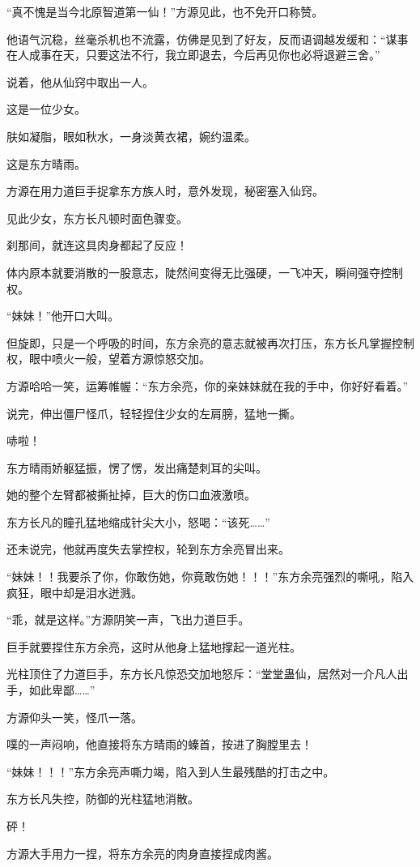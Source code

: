 \begin{this_body}
“真不愧是当今北原智道第一仙！”方源见此，也不免开口称赞。

他语气沉稳，丝毫杀机也不流露，仿佛是见到了好友，反而语调越发缓和：“谋事在人成事在天，只要这法不行，我立即退去，今后再见你也必将退避三舍。”

说着，他从仙窍中取出一人。

这是一位少女。

肤如凝脂，眼如秋水，一身淡黄衣裙，婉约温柔。

这是东方晴雨。

方源在用力道巨手捉拿东方族人时，意外发现，秘密塞入仙窍。

见此少女，东方长凡顿时面色骤变。

刹那间，就连这具肉身都起了反应！

体内原本就要消散的一股意志，陡然间变得无比强硬，一飞冲天，瞬间强夺控制权。

“妹妹！”他开口大叫。

但旋即，只是一个呼吸的时间，东方余亮的意志就被再次打压，东方长凡掌握控制权，眼中喷火一般，望着方源惊怒交加。

方源哈哈一笑，运筹帷幄：“东方余亮，你的亲妹妹就在我的手中，你好好看着。”

说完，伸出僵尸怪爪，轻轻捏住少女的左肩膀，猛地一撕。

哧啦！

东方晴雨娇躯猛振，愣了愣，发出痛楚刺耳的尖叫。

她的整个左臂都被撕扯掉，巨大的伤口血液激喷。

东方长凡的瞳孔猛地缩成针尖大小，怒喝：“该死……”

还未说完，他就再度失去掌控权，轮到东方余亮冒出来。

“妹妹！！我要杀了你，你敢伤她，你竟敢伤她！！！”东方余亮强烈的嘶吼，陷入疯狂，眼中却是泪水迸溅。

“乖，就是这样。”方源阴笑一声，飞出力道巨手。

巨手就要捏住东方余亮，这时从他身上猛地撑起一道光柱。

光柱顶住了力道巨手，东方长凡惊恐交加地怒斥：“堂堂蛊仙，居然对一介凡人出手，如此卑鄙……”

方源仰头一笑，怪爪一落。

噗的一声闷响，他直接将东方晴雨的螓首，按进了胸膛里去！

“妹妹！！！”东方余亮声嘶力竭，陷入到人生最残酷的打击之中。

东方长凡失控，防御的光柱猛地消散。

砰！

方源大手用力一捏，将东方余亮的肉身直接捏成肉酱。


\end{this_body}
